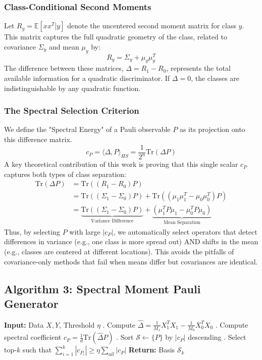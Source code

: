 \documentclass[conference]{IEEEtran}
\begin{document}
\subsubsection{Class-Conditional Second Moments}
Let $R_y = \mathbb{E}[xx^T | y]$ denote the uncentered second moment matrix for class $y$. This matrix captures the full quadratic geometry of the class, related to covariance $\Sigma_y$ and mean $\mu_y$ by:
\begin{equation}
    R_y = \Sigma_y + \mu_y \mu_y^T
\end{equation}
The difference between these matrices, $\Delta = R_1 - R_0$, represents the total available information for a quadratic discriminator. If $\Delta = 0$, the classes are indistinguishable by any quadratic function.

\subsubsection{The Spectral Selection Criterion}
We define the "Spectral Energy" of a Pauli observable $P$ as its projection onto this difference matrix.
\begin{equation}
    c_P = \langle \Delta, P \rangle_{HS} = \frac{1}{2^n} \text{Tr}(\Delta P)
\end{equation}
A key theoretical contribution of this work is proving that this single scalar $c_P$ captures both types of class separation:
\begin{align}
    \text{Tr}(\Delta P) &= \text{Tr}((R_1 - R_0)P) \\
    &= \text{Tr}((\Sigma_1 - \Sigma_0)P) + \text{Tr}((\mu_1\mu_1^T - \mu_0\mu_0^T)P) \\
    &= \underbrace{\text{Tr}((\Sigma_1 - \Sigma_0)P)}_{\text{Variance Difference}} + \underbrace{(\mu_1^T P \mu_1 - \mu_0^T P \mu_0)}_{\text{Mean Separation}}
\end{align}
Thus, by selecting $P$ with large $|c_P|$, we automatically select operators that detect differences in variance (e.g., one class is more spread out) AND shifts in the mean (e.g., classes are centered at different locations). This avoids the pitfalls of covariance-only methods that fail when means differ but covariances are identical.

\subsection{Algorithm 3: Spectral Moment Pauli Generator}
\begin{algorithm}
\caption{Spectral Moment Pauli Generator}
\begin{algorithmic}
\STATE \textbf{Input:} Data $X, Y$, Threshold $\eta$
. Compute $\hat{\Delta} = \frac{1}{M_1} X_1^T X_1 - \frac{1}{M_0} X_0^T X_0$
    . Compute spectral coefficient $c_P = \frac{1}{d} \text{Tr}(\hat{\Delta} P)$
\ENDFOR
{}. Sort $\mathcal{S} \leftarrow \{P\}$ by $|c_P|$ descending
. Select top-$k$ such that $\sum_{i=1}^k |c_{P_i}| \ge \eta \sum_{all} |c_P|$
\STATE \textbf{Return:} Basis $\mathcal{S}_k$
\end{algorithmic}
\end{algorithm}
\end{document}
